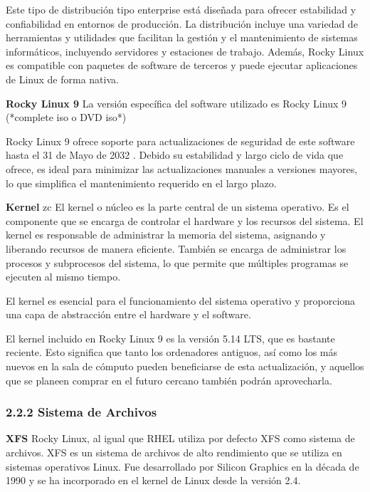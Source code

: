 \begin{doublespace}
\begin{multicols}{2}
    Este tipo de distribución tipo enterprise está diseñada para ofrecer estabilidad y confiabilidad en entornos de producción. La distribución incluye una variedad de herramientas y utilidades que facilitan la gestión y el mantenimiento de sistemas informáticos, incluyendo servidores y estaciones de trabajo. Además, Rocky Linux es compatible con paquetes de software de terceros y puede ejecutar aplicaciones de Linux de forma nativa. \cite{RL-1}

    \textbf{Rocky Linux 9}
    \newline
    La versión específica del software utilizado es Rocky Linux 9 (*complete iso o DVD iso*) \cite{RL9-download-1} \cite{RL9-release-1}  \cite{RHEL-release-1} 

    Rocky Linux 9 ofrece soporte para actualizaciones de seguridad de este software hasta el 31 de Mayo de 2032 \cite{RL9-EOL-1}. Debido su estabilidad y largo ciclo de vida que ofrece, es ideal para minimizar las actualizaciones manuales a versiones mayores, lo que simplifica el mantenimiento requerido en el largo plazo.

    \textbf{Kernel}
zc  
    El kernel o núcleo es la parte central de un sistema operativo. Es el componente que se encarga de controlar el hardware y los recursos del sistema. El kernel es responsable de administrar la memoria del sistema, asignando y liberando recursos de manera eficiente. También se encarga de administrar los procesos y subprocesos del sistema, lo que permite que múltiples programas se ejecuten al mismo tiempo.

    El kernel es esencial para el funcionamiento del sistema operativo y proporciona una capa de abstracción entre el hardware y el software.  \cite{RHEL-kernel-1}

    El kernel incluido en Rocky Linux 9 es la versión 5.14 LTS, que es bastante reciente. Esto significa que tanto los ordenadores antiguos, así como los más nuevos en la sala de cómputo pueden beneficiarse de esta actualización, y aquellos que se planeen comprar en el futuro cercano también podrán aprovecharla. \cite{RL9-release-1}

    \subsubsection{2.2.2 Sistema de Archivos}

    \textbf{XFS}
    \newline
    Rocky Linux, al igual que RHEL utiliza por defecto XFS como sistema de archivos. XFS es un sistema de archivos de alto rendimiento que se utiliza en sistemas operativos Linux. Fue desarrollado por Silicon Graphics en la década de 1990 y se ha incorporado en el kernel de Linux desde la versión 2.4.


\end{multicols}
\end{doublespace}
